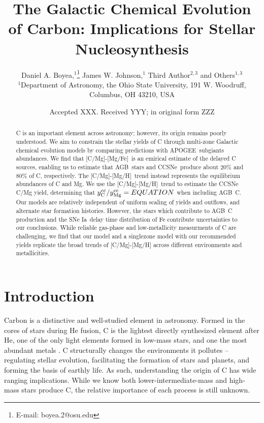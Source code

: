 \documentclass[fleqn,
usenatbib]{mnras}
\title[The Origin and Galactic Evolution of Carbon]{The Galactic Chemical Evolution of Carbon: Implications for Stellar Nucleosynthesis }
\author[D. A. Boyea et. al.]{
Daniel A. Boyea,$^{1}$\thanks{E-mail: boyea.2@osu.edu}
James W. Johnson,$^{1}$
Third Author$^{2,3}$
and Others$^{1,3}$
\\
$^{1}$Department of Astronomy, the Ohio State University, 191 W. Woodruff, Columbus, OH 43210, USA
}
\date{Accepted XXX. Received YYY; in original form ZZZ}
\newcommand{\agb}{AGB}
\newcommand{\apogee}{APOGEE}
\newcommand{\cc}{CCSNe}
\newcommand{\ia}{SNe Ia}
\newcommand{\caah}{[C/Mg]-[Mg/H]}
\newcommand{\caafe}{[C/Mg]-[Mg/Fe]}
\newcommand{\Ycc}{\ensuremath{y_{\rm C}^{\rm cc}}}
\newcommand{\Yoc}{\ensuremath{y_{\rm Mg}^{\rm cc}}}
\begin{document}
\label{firstpage}
\pagerange{\pageref{firstpage}--\pageref{lastpage}}
\maketitle



\begin{abstract}
C is an important element across astronomy; however, its origin remains poorly understood. 
% 
We aim to constrain the stellar yields of C through multi-zone Galactic chemical evolution models by comparing predictions with \apogee\ subgiants abundances.
% 
We find that \caafe\ is an emirical estimate of the delayed C sources, enabling us to estimate that \agb\ stars and \cc\ produce about 20\% and 80\% of C, respectively.  
The \caah\ trend instead represents the equilibrium abundances of C and Mg. 
We use the \caah\ trend to estimate the CCSNe C/Mg yield, determining that  $\Ycc/\Yoc = EQUATION$ when including \agb\ C. 
Our models are relatively independent of uniform scaling of yields and outflows, and alternate star formation histories. 
However, the stars which contribute to \agb\ C production and the \ia\ delay time distribution of Fe contribute uncertainties to our conclusions. 
While reliable gas-phase and low-metallicity measurments of C are challenging, we find that our model and a singlezone model with our recommended yields replicate the broad trends of \caah{} across different environments and metallicities. 

\end{abstract}







\section{Introduction}


Carbon is a distinctive and well-studied element in astronomy. 
Formed in the cores of stars during He fusion, C is the lightest directly synthesized element after He, one of the only light elements formed in low-mass stars, and one the most abundant metals \citep[e.g.][]{jennifer19, KL14}.\footnotemark{}
C structurally changes the environments it pollutes -- regulating stellar evolution, facilitating the formation of stars and planets, and forming the basis of earthly life.
As such, understanding the origin of C has wide ranging implications. 
While we know both lower-intermediate-mass and high-mass stars produce C, the relative importance of each process is still unknown.
\end{document}
